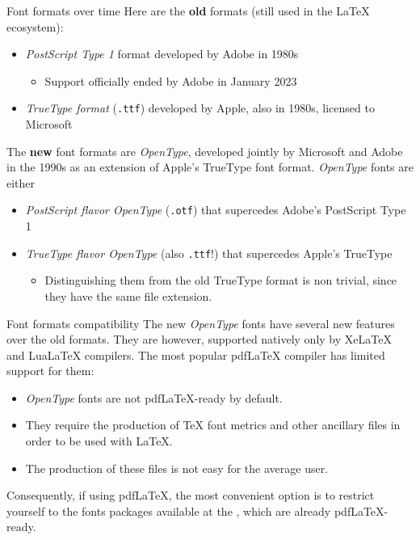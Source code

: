 \begin{frame}[fragile]{Font formats over time}
Here are the \textbf{old} formats (still used in the LaTeX ecosystem):

\begin{itemize}
\item \emph{PostScript Type 1} format developed by Adobe in 1980s
\begin{itemize}
    \item Support officially ended by Adobe in January 2023
\end{itemize}
\item \emph{TrueType format} (\verb|.ttf|) developed by Apple, also in 1980s, licensed to Microsoft
\end{itemize}

The \textbf{new} font formats are \emph{OpenType}, developed jointly by Microsoft and Adobe in the 1990s as an extension of Apple's TrueType font format. \emph{OpenType} fonts are either

\begin{itemize}
\item \emph{PostScript flavor OpenType} (\verb|.otf|) that supercedes Adobe's PostScript Type 1
\item \emph{TrueType flavor OpenType} (also \verb|.ttf|!) that supercedes Apple's TrueType
    \begin{itemize}
    \item Distinguishing them from the old TrueType format is non trivial, since they have the same file extension.
    \end{itemize}
\end{itemize}
\end{frame}


\begin{frame}[fragile]{Font formats compatibility}
The new \emph{OpenType} fonts have several new features over the old formats. They are however, supported natively only by XeLaTeX and LuaLaTeX compilers. The most popular pdfLaTeX compiler has limited support for them:
\begin{itemize}
\item \emph{OpenType} fonts are not pdfLaTeX-ready by default.
\item They require the production of TeX font metrics and other ancillary files in order to be used with LaTeX.
\item The production of these files is not easy for the average user.
\end{itemize}
Consequently, if using pdfLaTeX, the most convenient option is to restrict yourself to the fonts packages available at the , which are already pdfLaTeX-ready.
\end{frame}


